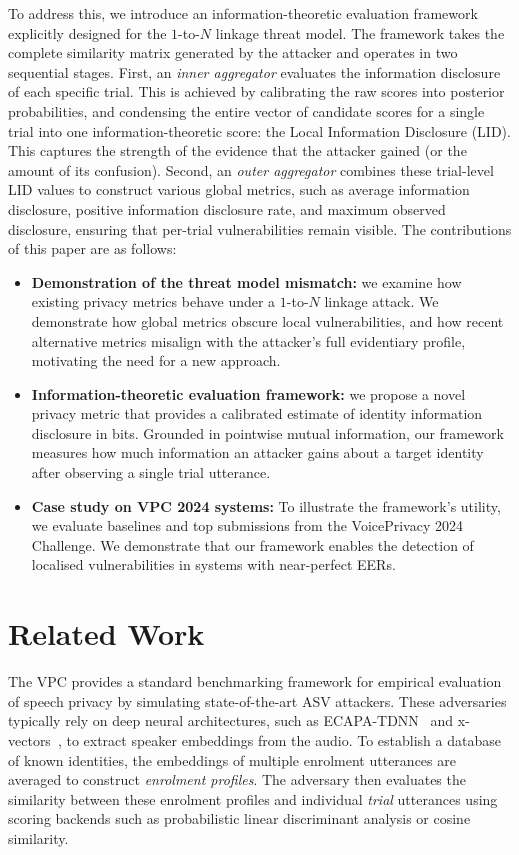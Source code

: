To address this, we introduce an information-theoretic evaluation framework explicitly designed for the $1$-to-$N$ linkage threat model. The framework takes the complete similarity matrix generated by the attacker and operates in two sequential stages. First, an \textit{inner aggregator} evaluates the information disclosure of each specific trial. This is achieved by calibrating the raw scores into posterior probabilities, and condensing the entire vector of candidate scores for a single trial into one information-theoretic score: the Local Information Disclosure (LID). This captures the strength of the evidence that the attacker gained (or the amount of its confusion). Second, an \textit{outer aggregator} combines these trial-level LID values to construct various global metrics, such as average information disclosure, positive information disclosure rate, and maximum observed disclosure, ensuring that per-trial vulnerabilities remain visible.
The contributions of this paper are as follows:
\begin{itemize}
    \item \textbf{Demonstration of the threat model mismatch:} we examine how existing privacy metrics behave under a $1$-to-$N$ linkage attack. We demonstrate how global metrics obscure local vulnerabilities, and how recent alternative metrics misalign with the attacker's full evidentiary profile, motivating the need for a new approach.
    \item \textbf{Information-theoretic evaluation framework:} we propose a novel privacy metric that provides a calibrated estimate of identity information disclosure in bits. Grounded in pointwise mutual information, our framework measures how much information an attacker gains about a target identity after observing a single trial utterance.
    \item \textbf{Case study on VPC 2024 systems:} To illustrate the framework's utility, we evaluate baselines and top submissions from the VoicePrivacy 2024 Challenge. We demonstrate that our framework enables the detection of localised vulnerabilities in systems with near-perfect EERs.
\end{itemize}


\section{Related Work}
\label{sec:background}
The VPC provides a standard benchmarking framework for empirical evaluation of speech privacy by simulating state-of-the-art ASV attackers. These adversaries typically rely on deep neural architectures, such as ECAPA-TDNN~\cite{desplanques2020ecapa} and x-vectors~\cite{snyder2018x}, to extract speaker embeddings from the audio.
To establish a database of known identities, the embeddings of multiple enrolment utterances are averaged to construct \textit{enrolment profiles}. The adversary then evaluates the similarity between these enrolment profiles and individual \textit{trial} utterances using scoring backends such as probabilistic linear discriminant analysis or cosine similarity.


